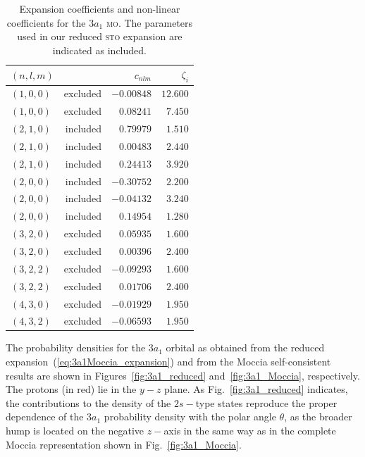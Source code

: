 \begin{table}[t]
\centering
\caption{\label{tab:3a1_coef} Expansion coefficients and non-linear
  coefficients for the $3a_{1}$ \textsc{mo}. The parameters used in
  our reduced \textsc{sto} expansion are indicated as included.}
\begin{tabular}{lrrr}
\toprule
$(n,l,m)$ & & $c_{nlm}$ & $\zeta_{i}$ \\
\midrule[0.25pt]
 $(1,0,0)$ & excluded & $-0.00848$ & $12.600$ \\
 $(1,0,0)$ & excluded & $0.08241$ & $7.450$ \\
\midrule[0.25pt]
 $(2,1,0)$ & included & $0.79979$ & $1.510$  \\
 $(2,1,0)$ & included & $0.00483$ & $2.440$  \\
 $(2,1,0)$ & included & $0.24413$ & $3.920$  \\
 $(2,0,0)$ & included & $-0.30752$ & $2.200$ \\
 $(2,0,0)$ & included & $-0.04132$ & $3.240$ \\
 $(2,0,0)$ & included & $0.14954$ & $1.280$ \\
\midrule[0.25pt]
 $(3,2,0)$ & excluded & $0.05935$ & $1.600$ \\
 $(3,2,0)$ & excluded & $0.00396$ & $2.400$ \\
 $(3,2,2)$ & excluded & $-0.09293$ & $1.600$ \\
 $(3,2,2)$ & excluded & $0.01706$ & $2.400$ \\
 $(4,3,0)$ & excluded & $-0.01929$ & $1.950$ \\
 $(4,3,2)$ & excluded & $-0.06593$ & $1.950$ \\
\bottomrule
\end{tabular}
\end{table}

The probability densities for the $3a_{1}$ orbital as obtained from
the reduced expansion~(\ref{eq:3a1Moccia_expansion}) and from the
Moccia self-consistent results are shown in
Figures~\ref{fig:3a1_reduced} and~\ref{fig:3a1_Moccia},
respectively. The protons (in red) lie in the $y-z$ plane. As
Fig.~\ref{fig:3a1_reduced} indicates, the contributions to the density
of the $2s-$type states reproduce the proper dependence of the
$3a_{1}$ probability density with the polar angle $\theta$, as the
broader hump is located on the negative $z-$axis in the same way as in
the complete Moccia representation shown in Fig.~\ref{fig:3a1_Moccia}.

